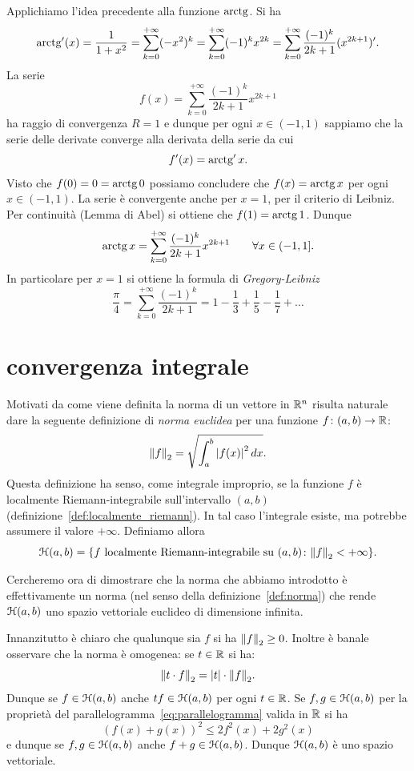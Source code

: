 \begin{example}
Applichiamo l'idea precedente alla funzione $\operatorname{arctg}$. Si ha
\[
  \operatorname{arctg}'(x) = \frac{1}{1+x^2} = \sum_{k=0}^{+\infty} (-x^2)^k
  = \sum_{k=0}^{+\infty} (-1)^k x^{2k}
  = \sum_{k=0}^{+\infty} \frac{(-1)^k}{2k+1}(x^{2k+1})'.
\]
La serie
\[
 f(x) = \sum_{k=0}^{+\infty}\frac{(-1)^k}{2k+1} x^{2k+1}
\]
ha raggio di convergenza $R=1$ e dunque per ogni $x\in(-1,1)$ sappiamo che la serie delle derivate converge alla derivata della serie da cui
\[
  f'(x) = \operatorname{arctg}' x.
\]
Visto che $f(0) = 0 = \operatorname{arctg} 0$ possiamo concludere che $f(x) =\operatorname{arctg} x$ per ogni $x\in (-1,1)$.
La serie è convergente anche per $x=1$, per il criterio di Leibniz. Per continuità (Lemma di Abel) si ottiene che $f(1) = \operatorname{arctg} 1$.
Dunque
\[
  \operatorname{arctg} x = \sum_{k=0}^{+\infty}\frac{(-1)^k}{2k+1}x^{2k+1}
  \qquad \forall x \in (-1,1].
\]
In particolare per $x=1$ si ottiene la formula di \emph{Gregory-Leibniz}%
\[
  \frac{\pi}{4} = \sum_{k=0}^{+\infty} \frac{(-1)^k}{2k+1} =
   1 - \frac{1}{3} + \frac{1}{5} - \frac{1}{7} + \dots
\]
\end{example}

\section{convergenza integrale}

Motivati da come viene definita la norma di un vettore
in ${\mathbb R}^n$ risulta naturale
dare la seguente definizione di
\emph{norma euclidea} per una funzione $f\colon (a,b)\to {\mathbb R}$:
\[
  {\left\Vert f\right\Vert}_2 = \sqrt{\int_a^b {\left|f(x)\right|}^2\, dx}.
\]
Questa definizione ha senso, come integrale improprio, se la funzione $f$
è localmente Riemann-integrabile sull'intervallo $(a,b)$
(definizione~\ref{def:localmente_riemann}).
In tal
caso l'integrale esiste, ma potrebbe assumere il valore $+\infty$. Definiamo
allora
\[
\mathcal H(a,b) =
{\left\{ \text{$f$ localmente Riemann-integrabile su $(a,b)$}\colon {\left\Vert  f\right\Vert}_2< +\infty \right\}}.
\]

Cercheremo ora di dimostrare che la norma che abbiamo introdotto
è effettivamente un norma (nel senso della definizione~\ref{def:norma})
che rende $\mathcal H(a,b)$ uno spazio vettoriale euclideo di dimensione infinita.

Innanzitutto è chiaro che qualunque sia $f$ si ha
${\left\Vert  f\right\Vert}_2\ge 0$.
Inoltre è banale osservare che la norma è omogenea: se $t\in {\mathbb R}$ si ha:
\[
  {\left\Vert t\cdot f\right\Vert}_2= {\left|t\right|}\cdot {\left\Vert f\right\Vert}_2.
\]
Dunque se $f\in \mathcal H(a,b)$ anche $t f\in \mathcal H(a,b)$ per ogni $t \in {\mathbb R}$.
Se $f,g\in \mathcal H(a,b)$ per la proprietà del parallelogramma~\eqref{eq:parallelogramma}
valida in ${\mathbb R}$ si ha
\[
  (f(x) + g(x))^2 \le 2f^2(x) + 2 g^2(x)
\]
e dunque se $f,g \in \mathcal H(a,b)$ anche $f+g\in \mathcal H(a,b)$.
Dunque $\mathcal H(a,b)$ è uno spazio vettoriale.

